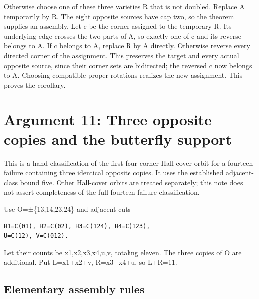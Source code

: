 \documentclass[
  10pt,
]{article}
\begin{document}
Otherwise choose one of these three varieties R that is not doubled.
Replace A temporarily by R. The eight opposite sources have cap two, so
the theorem supplies an assembly. Let c be the corner assigned to the
temporary R. Its underlying edge crosses the two parts of A, so exactly
one of c and its reverse belongs to A. If c belongs to A, replace R by A
directly. Otherwise reverse every directed corner of the assignment.
This preserves the target and every actual opposite source, since their
corner sets are bidirected; the reversed c now belongs to A. Choosing
compatible proper rotations realizes the new assignment. This proves the
corollary.

\hypertarget{arg-11}{%
\section{Argument 11: Three opposite copies and the butterfly
support}\label{arg-11}}

This is a hand classification of the first four-corner Hall-cover orbit
for a fourteen-failure containing three identical opposite copies. It
uses the established adjacent-class bound five. Other Hall-cover orbits
are treated separately; this note does not assert completeness of the
full fourteen-failure classification.

Use O=±\{13,14,23,24\} and adjacent cuts

\begin{verbatim}
H1=C(01), H2=C(02), H3=C(124), H4=C(123),
U=C(12), V=C(012).
\end{verbatim}

Let their counts be x1,x2,x3,x4,u,v, totaling eleven. The three copies
of O are additional. Put L=x1+x2+v, R=x3+x4+u, so L+R=11.

\hypertarget{elementary-assembly-rules}{%
\subsection*{Elementary assembly
rules}\label{elementary-assembly-rules}}
\end{document}
